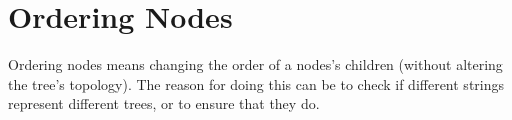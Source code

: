 \section{Ordering Nodes}
\label{sct_ordering}

Ordering nodes means changing the order of a nodes's children (without altering
the tree's topology). The reason for doing this can be to check if 
different \nw{} strings represent different trees, or to ensure that
they do.
